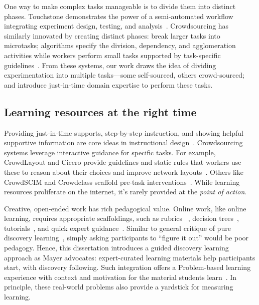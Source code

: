 One way to make complex tasks manageable is to divide them into distinct phases. 
Touchstone demonstrates the power of a semi-automated workflow integrating experiment 
design, testing, and analysis~\cite{Mackay2007}. Crowdsourcing has similarly innovated by 
creating distinct phases: break larger tasks into microtasks; algorithms specify the division, 
dependency, and agglomeration activities while workers perform small tasks supported by 
task-specific guidelines~\cite{lasecki2012real}. From these systems, our work draws the 
idea of dividing experimentation into multiple tasks—some self-sourced, others 
crowd-sourced; and introduce just-in-time domain expertise to perform these tasks. 

 

\subsection{Learning resources at the right time}
Providing just-in-time supports, step-by-step instruction, and showing helpful supportive
 information are core ideas in instructional design~\cite{Kirschner2008}. Crowdsourcing 
systems leverage interactive guidance for specific tasks. For example, CrowdLayout and 
Cicero provide guidelines and static rules that workers use these to reason about their choices
 and improve network layouts~\cite{chen2019cicero, Singh:2018:CCD:3173574.3173806}. 
Others like CrowdSCIM and Crowdclass scaffold pre-task interventions~\cite{Lee2016,wang2018exploring}. 
While learning resources proliferate on the internet, it's rarely provided at the \textit{point of action}. 

Creative, open-ended work has rich pedagogical value. Online work, like 
online learning, requires appropriate scaffoldings, such as rubrics
~\cite{Boud1995, Kulkarni2013peer}, decision trees~\cite{Lee2016,Yu2006}, 
tutorials~\cite{Andersen2012}, and quick expert guidance~\cite{dow2012shepherding}. 
Similar to general critique of pure discovery learning~\cite{Mayer2004}, simply 
asking participants to “figure it out” would be poor pedagogy. Hence, this dissertation
introduces a guided discovery learning approach as Mayer advocates: expert-curated 
learning materials help participants start, with discovery following. Such integration 
offers a Problem-based learning experience with context and 
motivation for the material students learn~\cite{Savery1995}. In principle, these 
real-world problems also provide a yardstick for measuring learning. 

